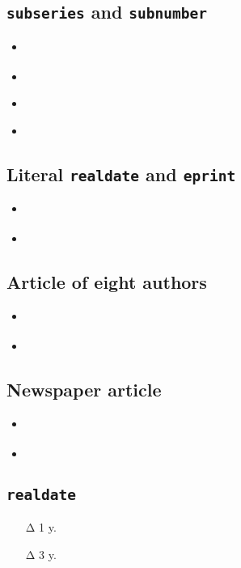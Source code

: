 \documentclass[a4paper,12pt]{scrartcl}
\newcommand{\Feld}[1]{\texttt{#1}}
\begin{document}
\subsection{\Feld{subseries} and \Feld{subnumber}}
\begin{itemize}
    \item\cite{kossack:et:al:1980}%
	\item{}%
    \item\cite{harck:1980}%
	\item{}%
\end{itemize}

\subsection{Literal \Feld{realdate} and \Feld{eprint}}
\begin{itemize}
    \item\cite{lindauer:oj}%
	\item{}%
\end{itemize}

\subsection{Article of eight authors}
\begin{itemize}
    \item\cite{summerhayes:et:al:1993}%
	\item{}%
\end{itemize}

\subsection{Newspaper article}
\begin{itemize}
    \item\cite{stafford:2004}%
	\item{}%
\end{itemize}

\subsection{\Feld{realdate}}
\begin{itemize}
    \item[Δ 1 y.]%
	\item[Δ 3 y.]%
\end{itemize}

\printbibliography

\end{document}
